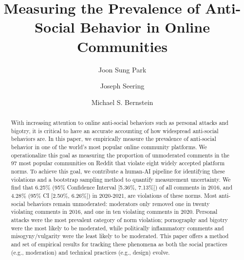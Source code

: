 \documentclass[acmsmall]{acmart}
\begin{document}
\title[Measuring the Prevalence of Anti-Social Behavior]{Measuring the Prevalence of Anti-Social Behavior in Online Communities}

\author{Joon Sung Park}

\author{Joseph Seering}

\author{Michael S. Bernstein}

\renewcommand{\shortauthors}{Joon Sung Park et al.}

\begin{abstract}
    With increasing attention to online anti-social behaviors such as personal attacks and bigotry, it is critical to have an accurate accounting of how widespread anti-social behaviors are. In this paper, we empirically measure the prevalence of anti-social behavior in one of the world's most popular online community platforms. We operationalize this goal as measuring the proportion of unmoderated comments in the 97 most popular communities on Reddit that violate eight widely accepted platform norms. To achieve this goal, we contribute a human-AI pipeline for identifying these violations and a bootstrap sampling method to quantify measurement uncertainty. We find that 6.25\% (95\% Confidence Interval [5.36\%, 7.13\%]) of all comments in 2016, and 4.28\% (95\% CI [2.50\%, 6.26\%]) in 2020-2021, are violations of these norms. Most anti-social behaviors remain unmoderated: moderators only removed one in twenty violating comments in 2016, and one in ten violating comments in 2020. Personal attacks were the most prevalent category of norm violation; pornography and bigotry were the most likely to be moderated, while politically inflammatory comments and misogyny/vulgarity were the least likely to be moderated. This paper offers a method and set of empirical results for tracking these phenomena as both the social practices (e.g., moderation) and technical practices (e.g., design) evolve.


\end{abstract}
\end{document}
